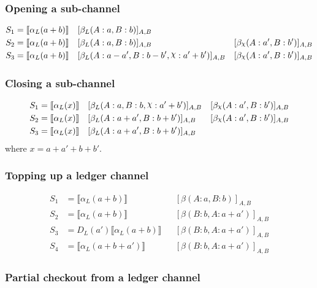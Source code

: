 \documentclass{article}
\DeclareRobustCommand{\rchi}{{\mathpalette\irchi\relax}}
\newcommand{\irchi}[2]{\raisebox{\depth}{$#1\chi$}} %
\theoremstyle{definition}
\newcommand{\adj}[1]{\llbracket #1 \rrbracket}
\newcommand{\enf}[1]{[#1]}
\begin{document}
\subsubsection{Opening a sub-channel}

\begin{align*}
  S_1 &= \adj{\alpha_L(a+b)} &&\enf{\beta_L(A: a, B: b)}_{A, B} & \\
  S_2 &= \adj{\alpha_L(a+b)} &&\enf{\beta_L(A: a, B: b)}_{A, B}&\enf{\beta_\rchi(A: a', B: b')}_{A, B} \\
  S_3 &= \adj{\alpha_L(a+b)} &&\enf{\beta_L(A: a-a', B: b-b', \rchi: a' + b')}_{A, B}&\enf{\beta_\rchi(A: a', B: b')}_{A, B}
\end{align*}

\subsubsection{Closing a sub-channel}

\begin{align*}
S_1 &= \adj{\alpha_L(x)} &&\enf{\beta_L(A: a, B: b, \rchi: a' + b')}_{A, B}&\enf{\beta_\rchi(A: a', B: b')}_{A, B}\\
S_2 &= \adj{\alpha_L(x)} &&\enf{\beta_L(A: a + a', B: b + b')}_{A, B}&\enf{\beta_\rchi(A: a', B: b')}_{A, B} \\
S_3 &= \adj{\alpha_L(x)} &&\enf{\beta_L(A: a + a', B: b + b')}_{A, B} & 
\end{align*}
where $x = a + a' + b + b'$.

\subsubsection{Topping up a ledger channel}

\begin{align*}
S_1 &= \adj{\alpha_L(a + b)} &&\enf{\beta(A: a, B: b)}_{A, B} \\
S_2 &= \adj{\alpha_L(a + b)} &&\enf{\beta(B: b, A: a + a')}_{A, B} \\
S_3 &= D_L(a')\adj{\alpha_L(a + b)} &&\enf{\beta(B: b, A: a + a')}_{A, B} \\
S_4 &= \adj{\alpha_L(a + b + a')} &&\enf{\beta(B: b, A: a + a')}_{A, B}
\end{align*}

\subsubsection{Partial checkout from a ledger channel}
\end{document}
